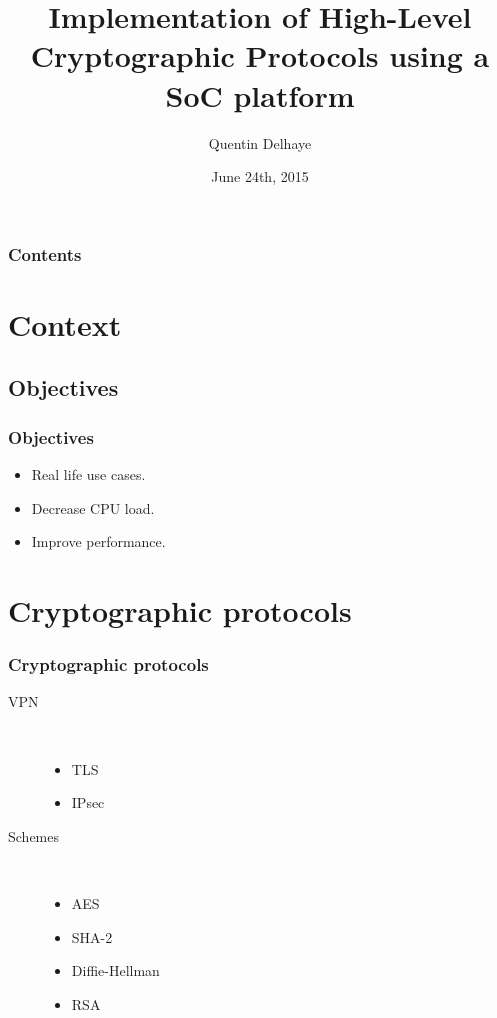 \documentclass[xcolor={x11names, rgb, usenames, dvipsnames}]{beamer}
\author{Quentin Delhaye}
\title[Crypto using a Soc Platform]{Implementation of High-Level\\ Cryptographic Protocols using a SoC platform}
\institute[ULB]{Université Libre de Bruxelles}
\date{June 24th, 2015}
\begin{document}
\begin{frame}
\titlepage
\end{frame}

\begin{frame}
	\frametitle{Contents}
	\tableofcontents[hideallsubsections]
\end{frame}


\section{Context}

\subsection{Objectives}
\begin{frame}
\frametitle{Objectives}
\begin{itemize}
	\item Real life use cases.
	\item Decrease CPU load.
	\item Improve performance.
\end{itemize}
\end{frame}








\section{Cryptographic protocols}

\begin{frame}
\frametitle{Cryptographic protocols}
\begin{description}
	\item[VPN]~\\
		\begin{itemize}
			\item TLS
			\item IPsec
		\end{itemize}
	\item[Schemes]~\\
		\begin{itemize}
			\item AES
			\item SHA-2
			\item Diffie-Hellman
			\item RSA
		\end{itemize}
\end{description}
\end{frame}
\end{document}
